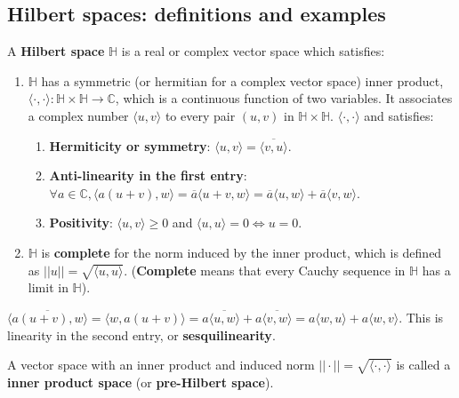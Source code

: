 \subsection{Hilbert spaces: definitions and examples}

\begin{definition}
	A \textbf{Hilbert space} $\mathbb{H}$ is a real or complex vector space which satisfies:
	\begin{enumerate}
		\item $\mathbb{H}$ has a symmetric (or hermitian for a complex vector space) inner product, $\langle \cdot, \cdot \rangle: \mathbb{H} \times \mathbb{H} \rightarrow \mathbb{C}$, which is a continuous function of two variables. It associates a complex number $\langle u, v \rangle$ to every pair $(u, v)$ in $\mathbb{H} \times \mathbb{H}$. $\langle \cdot, \cdot \rangle$ and satisfies:
		\begin{enumerate}
			\item \textbf{Hermiticity or symmetry}: $\langle u, v \rangle = \overline{\langle v, u \rangle}$.
			\item \textbf{Anti-linearity in the first entry}: $\forall a \in \mathbb{C}, \langle a(u + v), w \rangle = \overline{a} \langle u + v, w \rangle = \overline{a} \langle u, w \rangle + \overline{a} \langle v, w \rangle$.
			\item \textbf{Positivity}: $\langle u, v \rangle \ge 0$ and $\langle u, u \rangle = 0 \Longleftrightarrow u = 0$.
		\end{enumerate}
		\item $\mathbb{H}$ is \textbf{complete} for the norm induced by the inner product, which is defined as $||u|| = \sqrt{\langle u, u \rangle}$. (\textbf{Complete} means that every Cauchy sequence in $\mathbb{H}$ has a limit in $\mathbb{H}$).
	\end{enumerate}
\end{definition}

\begin{remark}
	$\overline{\langle a(u + v), w \rangle} = \langle w, a(u + v) \rangle = a \overline{\langle u, w \rangle} + a \overline{\langle v, w \rangle} = a \langle w, u \rangle + a \langle w, v \rangle$. This is linearity in the second entry, or \textbf{sesquilinearity}.
\end{remark}

\begin{definition}
	A vector space with an inner product and induced norm $||\cdot|| = \sqrt{\langle \cdot, \cdot \rangle}$ is called a \textbf{inner product space} (or \textbf{pre-Hilbert space}).
\end{definition}

